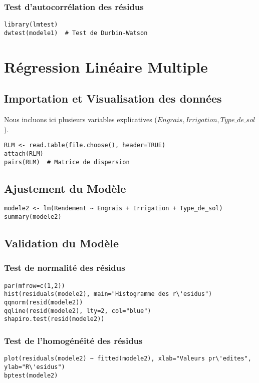 \documentclass{article}
\begin{document}
\subsubsection{Test d'autocorr\'elation des r\'esidus}
\begin{verbatim}
library(lmtest)
dwtest(modele1)  # Test de Durbin-Watson
\end{verbatim}

\section{R\'egression Lin\'eaire Multiple}
\subsection{Importation et Visualisation des donn\'ees}
Nous incluons ici plusieurs variables explicatives ($Engrais, Irrigation, Type\_de\_sol$).

\begin{verbatim}
RLM <- read.table(file.choose(), header=TRUE)
attach(RLM)
pairs(RLM)  # Matrice de dispersion
\end{verbatim}

\subsection{Ajustement du Mod\`ele}

\begin{verbatim}
modele2 <- lm(Rendement ~ Engrais + Irrigation + Type_de_sol)
summary(modele2)
\end{verbatim}

\subsection{Validation du Mod\`ele}
\subsubsection{Test de normalit\'e des r\'esidus}
\begin{verbatim}
par(mfrow=c(1,2))
hist(residuals(modele2), main="Histogramme des r\'esidus")
qqnorm(resid(modele2))
qqline(resid(modele2), lty=2, col="blue")
shapiro.test(resid(modele2))
\end{verbatim}

\subsubsection{Test de l'homog\'en\'eit\'e des r\'esidus}
\begin{verbatim}
plot(residuals(modele2) ~ fitted(modele2), xlab="Valeurs pr\'edites", ylab="R\'esidus")
bptest(modele2)
\end{verbatim}
\end{document}
